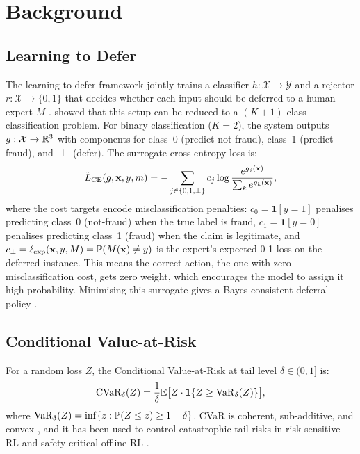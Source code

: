 \section{Background}
\label{sec:background}

\subsection{Learning to Defer}
\label{sec:bg_l2d}

The learning-to-defer framework jointly trains a classifier $h: \mathcal{X} \to \mathcal{Y}$ and a rejector $r: \mathcal{X} \to \{0, 1\}$ that decides whether each input should be deferred to a human expert $M$ \citep{madras2018predict}. \citet{mozannar2020consistent} showed that this setup can be reduced to a $(K{+}1)$-class classification problem. For binary classification ($K=2$), the system outputs $g: \mathcal{X} \to \mathbb{R}^3$ with components for class~0 (predict not-fraud), class~1 (predict fraud), and $\perp$ (defer). The surrogate cross-entropy loss is:
\begin{equation}
    \tilde{L}_{\text{CE}}(g, \mathbf{x}, y, m) = -\sum_{j \in \{0,1,\perp\}} c_j \log \frac{e^{g_j(\mathbf{x})}}{\sum_k e^{g_k(\mathbf{x})}},
    \label{eq:mozannar_loss}
\end{equation}
where the cost targets encode misclassification penalties: $c_0 = \mathbf{1}[y{=}1]$ penalises predicting class~0 (not-fraud) when the true label is fraud, $c_1 = \mathbf{1}[y{=}0]$ penalises predicting class~1 (fraud) when the claim is legitimate, and $c_\perp = \ell_{\text{exp}}(\mathbf{x}, y, M) = \mathbb{P}(M(\mathbf{x}) \neq y)$ is the expert's expected 0-1 loss on the deferred instance. This means the correct action, the one with zero misclassification cost, gets zero weight, which encourages the model to assign it high probability. Minimising this surrogate gives a Bayes-consistent deferral policy \citep{mozannar2020consistent}.

\subsection{Conditional Value-at-Risk}
\label{sec:bg_cvar}

For a random loss $Z$, the Conditional Value-at-Risk at tail level $\delta \in (0,1]$ is:
\begin{equation}
    \mathrm{CVaR}_\delta(Z) = \frac{1}{\delta} \mathbb{E}\bigl[Z \cdot \mathbf{1}\{Z \geq \mathrm{VaR}_\delta(Z)\}\bigr],
    \label{eq:cvar}
\end{equation}
where $\mathrm{VaR}_\delta(Z) = \inf\{z : \mathbb{P}(Z \leq z) \geq 1 - \delta\}$. CVaR is coherent, sub-additive, and convex \citep{rockafellar2000optimization}, and it has been used to control catastrophic tail risks in risk-sensitive RL \citep{tamar2015optimizing} and safety-critical offline RL \citep{killian2023risk}.

